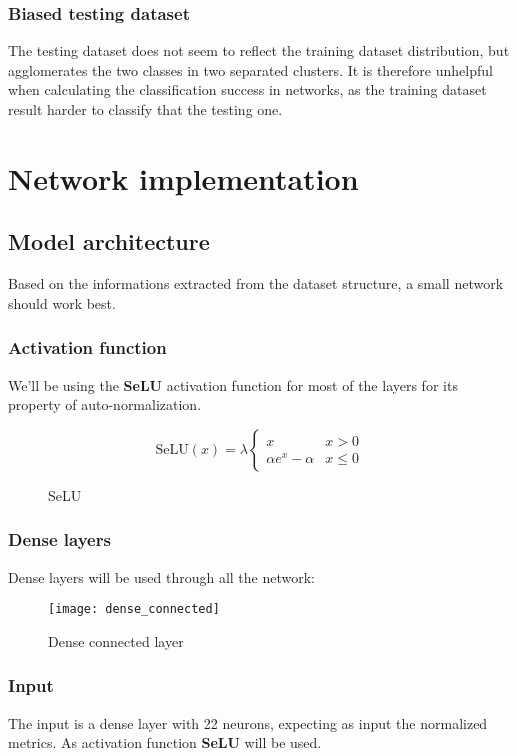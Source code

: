 \section{Biased testing dataset}
The testing dataset does not seem to reflect the training dataset distribution, but agglomerates the two classes in two separated clusters. It is therefore unhelpful when calculating the classification success in networks, as the training dataset result harder to classify that the testing one.

\part{Network implementation}
\chapter{Model architecture}
Based on the informations extracted from the dataset structure, a small network should work best.

\section{Activation function}
We'll be using the \textbf{SeLU} activation function for most of the layers for its property of auto-normalization.

\begin{figure}
	\[
		\text{SeLU}(x) = \lambda \begin{cases}
			x                 & x > 0    \\
			\alpha e^x-\alpha & x \leq 0
		\end{cases}
	\]
	\caption{SeLU}
\end{figure}

\section{Dense layers}
Dense layers will be used through all the network:
\begin{figure}
	\texttt{[image: dense\_connected]}
	\caption{Dense connected layer}
\end{figure}

\section{Input}
The input is a dense layer with 22 neurons, expecting as input the normalized metrics. As activation function \textbf{SeLU} will be used.

